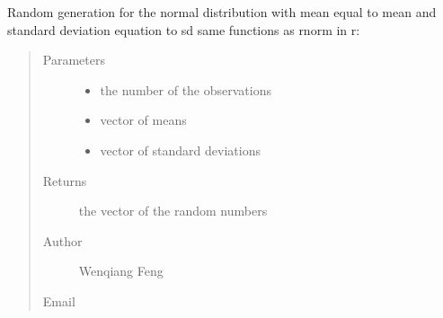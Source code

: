 \documentclass[letterpaper,12pt,english]{sphinxmanual}
\begin{document}
\begin{fulllineitems}
\label{\detokenize{api:statspy.basics.rnorm}}
Random generation for the normal distribution with mean
equal to mean and standard deviation equation to sd
same functions as rnorm in r: 
\begin{quote}\begin{description}
\item[{Parameters}] \leavevmode\begin{itemize}
\item {} 
 \textendash{} the number of the observations

\item {} 
 \textendash{} vector of means

\item {} 
 \textendash{} vector of standard deviations

\end{itemize}

\item[{Returns}] \leavevmode
the vector of the random numbers

\item[{Author}] \leavevmode
Wenqiang Feng

\item[{Email}] \leavevmode
{}

\end{description}\end{quote}

\end{fulllineitems}



\section{}
\label{\detokenize{api:dnorm}}
\end{document}
